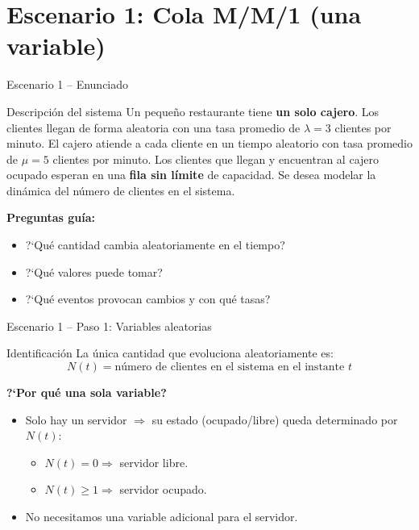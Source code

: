 \documentclass[aspectratio=1610, 9pt]{beamer}
\begin{document}
\section{Escenario 1: Cola M/M/1 (una variable)}

\begin{frame}{Escenario 1 -- Enunciado}
\begin{exampleblock}{Descripción del sistema}
Un peque\~no restaurante tiene \textbf{un solo cajero}. Los clientes llegan de forma aleatoria con una tasa promedio de $\lambda = 3$ clientes por minuto. El cajero atiende a cada cliente en un tiempo aleatorio con tasa promedio de $\mu = 5$ clientes por minuto. Los clientes que llegan y encuentran al cajero ocupado esperan en una \textbf{fila sin l\'imite} de capacidad. Se desea modelar la din\'amica del n\'umero de clientes en el sistema.
\end{exampleblock}

\vspace{6pt}
\textbf{Preguntas gu\'ia:}
\begin{itemize}
    \item ?`Qu\'e cantidad cambia aleatoriamente en el tiempo?
    \item ?`Qu\'e valores puede tomar?
    \item ?`Qu\'e eventos provocan cambios y con qu\'e tasas?
\end{itemize}
\end{frame}

\begin{frame}{Escenario 1 -- Paso 1: Variables aleatorias}
\begin{block}{Identificaci\'on}
La \'unica cantidad que evoluciona aleatoriamente es:
\[
N(t) = \text{n\'umero de clientes en el sistema en el instante } t
\]
\end{block}

\vspace{6pt}
\textbf{?`Por qu\'e una sola variable?}
\begin{itemize}
    \item Solo hay un servidor $\Rightarrow$ su estado (ocupado/libre) queda determinado por $N(t)$:
    \begin{itemize}
        \item $N(t)=0 \Rightarrow$ servidor libre.
        \item $N(t)\ge 1 \Rightarrow$ servidor ocupado.
    \end{itemize}
    \item No necesitamos una variable adicional para el servidor.
\end{itemize}
\end{frame}
\end{document}
